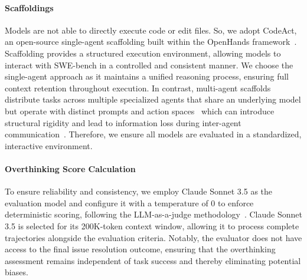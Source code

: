 \paragraph{Scaffoldings} Models are not able to directly execute code or edit files. So, we adopt CodeAct, an open-source single-agent scaffolding built within the OpenHands framework~\cite{openhands, qwq-32b-preview, openai_o1_mini, openai_o1_system_card_2024, deepseekai2025deepseekr1incentivizingreasoningcapability, sky_t1_2025}. Scaffolding provides a structured execution environment, allowing models to interact with SWE-bench in a controlled and consistent manner. We choose the single-agent approach as it maintains a unified reasoning process, ensuring full context retention throughout execution. In contrast, multi-agent scaffolds distribute tasks across multiple specialized agents that share an underlying model but operate with distinct prompts and action spaces~\cite{chen2024coderissueresolvingmultiagent,xia2024agentlessdemystifyingllmbasedsoftware, phan2024hyperagentgeneralistsoftwareengineering, allhands_single_agent_systems} which can introduce structural rigidity and lead to information loss during inter-agent communication~\cite{allhands_single_agent_systems}. Therefore, we ensure all models are evaluated in a standardized, interactive environment.



\paragraph{Overthinking Score Calculation} To ensure reliability and consistency, we employ Claude Sonnet 3.5 as the evaluation model and configure it with a temperature of 0 to enforce deterministic scoring, following the LLM-as-a-judge methodology~\cite{zheng2023judgingllmasajudgemtbenchchatbot}. Claude Sonnet 3.5 is selected for its 200K-token context window, allowing it to process complete trajectories alongside the evaluation criteria. Notably, the evaluator does not have access to the final issue resolution outcome, ensuring that the overthinking assessment remains independent of task success and thereby eliminating potential biases.